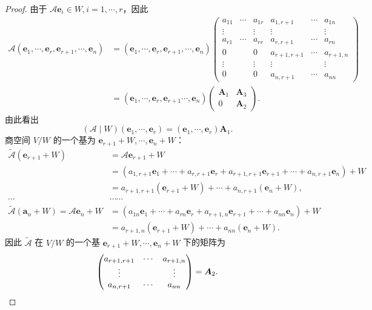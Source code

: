 \documentclass[12pt, a4paper,newtx]{ctexart}
\begin{document}
\begin{proof}
	由于 $\mathcal{A} \bm{e}_i \in W, i = 1, \cdots, r$，因此
	\begin{align*}
		\mathcal{A}(\bm{e}_1, \cdots, \bm{e}_r, \bm{e}_{r+1}, \cdots, \bm{e}_n) &= (\bm{e}_1, \cdots, \bm{e}_r, \bm{e}_{r+1}, \cdots, \bm{e}_n)
		\begin{pmatrix}
			a_{11} & \cdots & a_{1r} & a_{1,r+1} & \cdots & a_{1n} \\
			\vdots & & \vdots & \vdots & & \vdots \\
			a_{r1} & \cdots & a_{rr} & a_{r,r+1} & \cdots & a_{rn} \\
			0 & & 0 & a_{r+1,r+1} & \cdots & a_{r+1,n} \\
			\vdots & & \vdots & \vdots & & \vdots \\
			0 & & 0 & a_{n,r+1} & \cdots & a_{nn}
		\end{pmatrix}\\&= (\bm{e}_1, \cdots, \bm{e}_r, \bm{e}_{r+1} \cdots, \bm{e}_n)
		\begin{pmatrix}
		\bm{A}_1 & \bm{A}_3 \\
		0 & \bm {A}_2
		\end{pmatrix}.
	\end{align*}
	由此看出
	\[
	(\mathcal{A}\mid W)(\bm{e}_1, \cdots, \bm{e}_r) = (\bm{e}_1, \cdots, \bm{e}_r) \bm{A}_1. 
	\]
	商空间 $V/W$ 的一个基为 $\bm{e}_{r+1} + W, \cdots, \bm{e}_n + W$：\begin{align*}
		\widetilde{\mathcal{A}}(\bm{e}_{r+1} + W) &= \mathcal{A} \bm{e}_{r+1} + W\\&= (a_{1,r+1} \bm{e}_1 + \cdots + a_{r,r+1} \bm{e}_r + a_{r+1,r+1} \bm{e}_{r+1} + \cdots + a_{n,r+1} \bm{e}_n) + W\\&= a_{r+1,r+1} (\bm{e}_{r+1} + W) + \cdots + a_{n,r+1} (\bm{e}_n + W),\\\cdots&\cdots\cdots\\\widetilde{\mathcal{A}}(\bm{a}_n + W) = \mathcal{A} \bm{e}_n + W&= (a_{1n} \bm{e}_1 + \cdots + a_{rn} \bm{e}_r + a_{r+1,n} \bm{e}_{r+1} + \cdots + a_{nn} \bm{e}_n) + W\\&= a_{r+1,n} (\bm{e}_{r+1} + W) + \cdots + a_{nn} (\bm{e}_n + W).
	\end{align*}
	因此 $\widetilde{\mathcal{A}}$ 在 $V/W$ 的一个基 $\bm{e}_{r+1} + W, \cdots, \bm{e}_n + W$ 下的矩阵为
	\[
	\begin{pmatrix}
		a_{r+1,r+1} & \cdots & a_{r+1,n} \\
		\vdots & & \vdots \\
		a_{n,r+1} & \cdots & a_{nn}
	\end{pmatrix}
	= \bm{A}_2. \qedhere
	\]
\end{proof}
\end{document}
